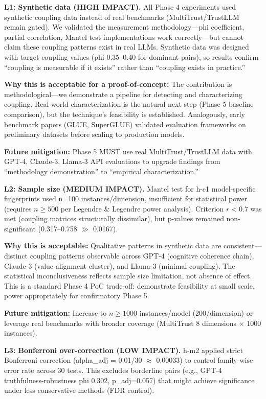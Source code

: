 \textbf{L1: Synthetic data (HIGH IMPACT).} All Phase 4 experiments used synthetic coupling data instead of real benchmarks (MultiTrust/TrustLLM remain gated). We validated the measurement methodology---phi coefficient, partial correlation, Mantel test implementations work correctly---but cannot claim these coupling patterns exist in real LLMs. Synthetic data was designed with target coupling values (phi 0.35--0.40 for dominant pairs), so results confirm ``coupling is measurable if it exists'' rather than ``coupling exists in practice.''

\textbf{Why this is acceptable for a proof-of-concept:} The contribution is methodological---we demonstrate a pipeline for detecting and characterizing coupling. Real-world characterization is the natural next step (Phase 5 baseline comparison), but the technique's feasibility is established. Analogously, early benchmark papers (GLUE, SuperGLUE) validated evaluation frameworks on preliminary datasets before scaling to production models.

\textbf{Future mitigation:} Phase 5 MUST use real MultiTrust/TrustLLM data with GPT-4, Claude-3, Llama-3 API evaluations to upgrade findings from ``methodology demonstration'' to ``empirical characterization.''

\textbf{L2: Sample size (MEDIUM IMPACT).} Mantel test for h-c1 model-specific fingerprints used n=100 instances/dimension, insufficient for statistical power (requires $n \geq 500$ per Legendre \& Legendre power analysis). Criterion $r < 0.7$ was met (coupling matrices structurally dissimilar), but p-values remained non-significant (0.317--0.758 $\gg$ 0.0167).

\textbf{Why this is acceptable:} Qualitative patterns in synthetic data are consistent---distinct coupling patterns observable across GPT-4 (cognitive coherence chain), Claude-3 (value alignment cluster), and Llama-3 (minimal coupling). The statistical inconclusiveness reflects sample size limitation, not absence of effect. This is a standard Phase 4 PoC trade-off: demonstrate feasibility at small scale, power appropriately for confirmatory Phase 5.

\textbf{Future mitigation:} Increase to $n \geq 1000$ instances/model (200/dimension) or leverage real benchmarks with broader coverage (MultiTrust 8 dimensions $\times$ 1000 instances).

\textbf{L3: Bonferroni over-correction (LOW IMPACT).} h-m2 applied strict Bonferroni correction (alpha\_adj = 0.01/30 $\approx$ 0.00033) to control family-wise error rate across 30 tests. This excludes borderline pairs (e.g., GPT-4 truthfulness-robustness phi 0.302, p\_adj=0.057) that might achieve significance under less conservative methods (FDR control).

